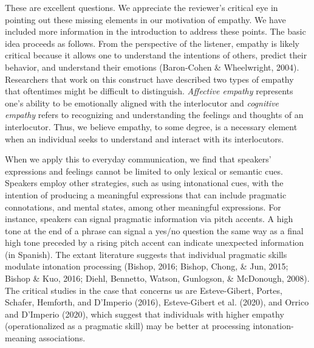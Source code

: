 \documentclass[]{article}
\newcommand{\TaskEstimationBox}[2]{%
\ifoptiondraft{\parbox{1.0\linewidth}{\hfill \hfill {\colorbox{#2}{\color{White} \textbf{#1}}}}}%
{}%
}
\def\Done {\TaskEstimationBox{Done}{Blue}}
\def\Easy {\TaskEstimationBox{Feasible}{ForestGreen}}
\begin{document}
\Done
\Easy


These are excellent questions.
We appreciate the reviewer's critical eye in pointing out these missing elements in our motivation of empathy.
We have included more information in the introduction to address these points.
The basic idea proceeds as follows.
From the perspective of the listener, empathy is likely critical because it allows one to understand the intentions of others, predict their behavior, and understand their emotions (Baron-Cohen \& Wheelwright, 2004).
Researchers that work on this construct have described two types of empathy that oftentimes might be difficult to distinguish.
\emph{Affective empathy} represents one's ability to be emotionally aligned with the interlocutor and \emph{cognitive empathy} refers to recognizing and understanding the feelings and thoughts of an interlocutor.
Thus, we believe empathy, to some degree, is a necessary element when an individual seeks to understand and interact with its interlocutors.

When we apply this to everyday communication, we find that speakers' expressions and feelings cannot be limited to only lexical or semantic cues.
Speakers employ other strategies, such as using intonational cues, with the intention of producing a meaningful expressions that can include pragmatic connotations, and mental states, among other meaningful expressions.
For instance, speakers can signal pragmatic information via pitch accents.
A high tone at the end of a phrase can signal a yes/no question the same way as a final high tone preceded by a rising pitch accent can indicate unexpected information (in Spanish).
The extant literature suggests that individual pragmatic skills modulate intonation processing (Bishop, 2016; Bishop, Chong, \& Jun, 2015; Bishop \& Kuo, 2016; Diehl, Bennetto, Watson, Gunlogson, \& McDonough, 2008).
The critical studies in the case that concerns us are Esteve-Gibert, Portes, Schafer, Hemforth, and D'Imperio (2016), Esteve-Gibert et al. (2020), and Orrico and D'Imperio (2020), which suggest that individuals with higher empathy (operationalized as a pragmatic skill) may be better at processing intonation-meaning associations.
\end{document}
